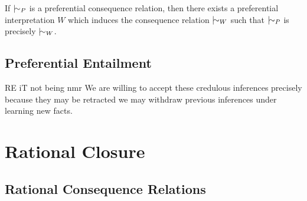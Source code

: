 \begin{theorem}[Completeness]
  \label{theorem:completeness-preferential} If $\twiddle_{P}$ is a preferential consequence relation, then there exists a preferential
  interpretation $W$ which induces the consequence relation $\twiddle_{W}$ such that $\twiddle_{P}$ is precisely $\twiddle_{W}$.
\end{theorem}

\subsection{Preferential Entailment}

RE iT not being nmr We are willing to accept these credulous inferences precisely because they may be retracted we may withdraw previous inferences
under learning new facts.

\section{Rational Closure}

\subsection{Rational Consequence Relations}